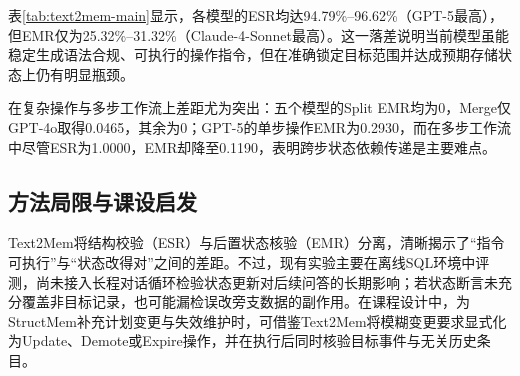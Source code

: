表\ref{tab:text2mem-main}显示，各模型的ESR均达94.79\%--96.62\%（GPT-5最高），但EMR仅为25.32\%--31.32\%（Claude-4-Sonnet最高）。这一落差说明当前模型虽能稳定生成语法合规、可执行的操作指令，但在准确锁定目标范围并达成预期存储状态上仍有明显瓶颈。

在复杂操作与多步工作流上差距尤为突出：五个模型的Split EMR均为0，Merge仅GPT-4o取得0.0465，其余为0；GPT-5的单步操作EMR为0.2930，而在多步工作流中尽管ESR为1.0000，EMR却降至0.1190，表明跨步状态依赖传递是主要难点。

\subsection{方法局限与课设启发}

Text2Mem将结构校验（ESR）与后置状态核验（EMR）分离，清晰揭示了“指令可执行”与“状态改得对”之间的差距。不过，现有实验主要在离线SQL环境中评测，尚未接入长程对话循环检验状态更新对后续问答的长期影响；若状态断言未充分覆盖非目标记录，也可能漏检误改旁支数据的副作用。在课程设计中，为StructMem补充计划变更与失效维护时，可借鉴Text2Mem将模糊变更要求显式化为Update、Demote或Expire操作，并在执行后同时核验目标事件与无关历史条目。

